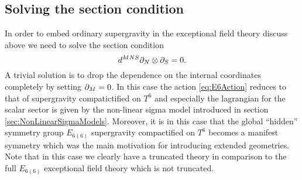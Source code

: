 \subsection{Solving the section condition}
In order to embed ordinary supergravity in the exceptional field theory discuss above we need to solve the section condition
\begin{equation}
    d^{MNS}\partial_N\otimes\partial_S = 0.
\end{equation}
A trivial solution is to drop the dependence on the internal coordinates completely by setting $\partial_M=0$. In this case the action \eqref{eq:E6Action} reduces to that of supergravity compatictified on $T^6$ and especially the lagrangian for the scalar sector is given by the non-linear sigma model introduced in section \ref{sec:NonLinearSigmaModels}. Moreover, it is in this case that the global ``hidden'' symmetry group $E_{6(6)}$ supergravity compactified on $T^6$  becomes a manifest symmetry which was the main motivation for introducing extended geometries. Note that in this case we clearly have a truncated theory in comparison to the full $E_{6(6)}$ exceptional field theory which is not truncated. 

